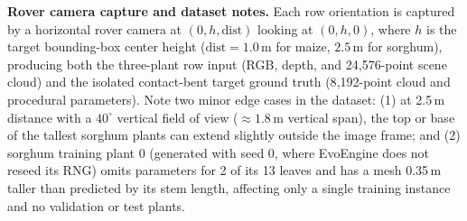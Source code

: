 \documentclass[10pt,twocolumn,letterpaper]{article}
\begin{document}
\begin{table}[h]
  \caption{\textbf{Crop row contact-solver convergence statistics.} ``Bent'' denotes orientations where at least one target leaf bent; ``Rolled'' denotes orientations where at least one neighbor leaf rolled. No orientation failed, and the solver's final exact triangle--triangle pass found no inter-plant crossings.}
  \label{tab:supp-rowstats}\label{tab:supp-row_stats}
  \centering\scriptsize
  \setlength{\tabcolsep}{2pt}
\end{table}

\noindent\textbf{Rover camera capture and dataset notes.}
Each row orientation is captured by a horizontal rover camera at $(0, h, \mathrm{dist})$ looking at $(0, h, 0)$, where $h$ is the target bounding-box center height ($\mathrm{dist} = 1.0$\,m for maize, $2.5$\,m for sorghum), producing both the three-plant row input (RGB, depth, and 24{,}576-point scene cloud) and the isolated contact-bent target ground truth (8{,}192-point cloud and procedural parameters). Note two minor edge cases in the dataset: (1) at 2.5\,m distance with a $40^\circ$ vertical field of view ($\approx 1.8$\,m vertical span), the top or base of the tallest sorghum plants can extend slightly outside the image frame; and (2) sorghum training plant 0 (generated with seed 0, where EvoEngine does not reseed its RNG) omits parameters for 2 of its 13 leaves and has a mesh 0.35\,m taller than predicted by its stem length, affecting only a single training instance and no validation or test plants.
\end{document}
